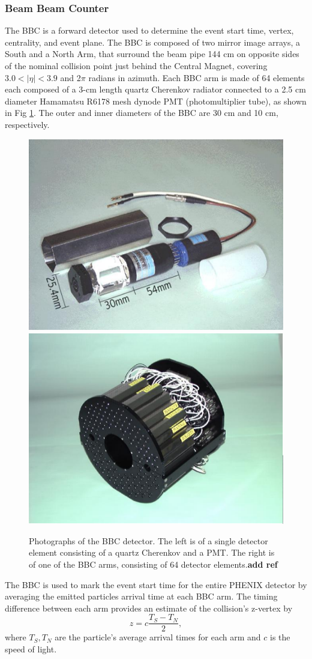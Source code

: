 \subsubsection{Beam Beam Counter}
The BBC is a forward detector used to determine the event start time, vertex, centrality, and event plane. The BBC is composed of two mirror image arrays, a South and a North Arm, that surround the beam pipe 144 cm on opposite sides of the nominal collision point just behind the Central Magnet, covering $3.0 < |\eta| < 3.9$ and 2$\pi$ radians in azimuth. Each BBC arm is made of 64 elements each composed of a 3-cm length quartz Cherenkov radiator connected to a 2.5 cm diameter Hamamatsu R6178 mesh dynode PMT (photomultiplier tube), as shown in Fig \ref{fig:bbc_dector}. The outer and inner diameters of the BBC are 30 cm and 10 cm, respectively.%
\begin{figure}[!ht]
\begin{center}
\includegraphics[width=0.45\linewidth]{figs/bbc_pmt.png}
\includegraphics[width=0.45\linewidth]{figs/bbc_arm.png}
\caption{Photographs of the BBC detector. The left is of a single detector element consisting of a quartz Cherenkov and a PMT. The right is of one of the BBC arms, consisting of 64 detector elements.\textbf{add ref}}
\label{fig:bbc_dector}
\end{center}
\end{figure}

The BBC is used to mark the event start time for the entire PHENIX detector by averaging the emitted particles arrival time at each BBC arm. The timing difference between each arm provides an estimate of the collision's z-vertex by
\begin{equation}
z = c \frac{T_S - T_N}{2},
\end{equation}
where $T_S, T_N$ are the particle's average arrival times for each arm and $c$ is the speed of light.%

